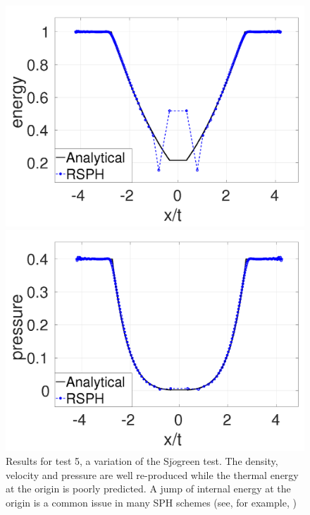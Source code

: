 \documentclass[review]{elsarticle}
\begin{document}
\begin{figure}[H]
\begin{minipage}{.415\textwidth}
        \includegraphics[width=0.99 \textwidth]{./Figures/Sjogreen-RCM-e-Adpt1}
    \end{minipage}%
    \begin{minipage}{.415 \textwidth}
        \centering
        \includegraphics[width=0.99 \textwidth]{./Figures/Sjogreen-RCM-p-Adpt1}
    \end{minipage}%
    \caption{Results for test 5, a variation of the Sj$\ddot{o}$green test. The density, velocity and pressure are well re-produced while the thermal energy at the origin is poorly predicted. A jump of internal energy at the origin is a common issue in many SPH schemes (see, for example, \citep{monaghan1997sph,cha2003implementations,puri2014approximate})}
    \label{fig:RCM-Sjogreen}
\end{figure}
\end{document}
